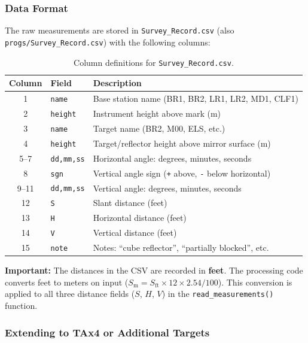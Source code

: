 \documentclass[11pt,letterpaper]{article}
\begin{document}
\subsubsection{Data Format}

The raw measurements are stored in \texttt{Survey\_Record.csv} (also \texttt{progs/Survey\_Record.csv}) with the following columns:

\begin{table}[H]
\centering
\caption{Column definitions for \texttt{Survey\_Record.csv}.}
\label{tab:csv_format}
\smallskip
\footnotesize
\begin{tabular}{@{}cll@{}}
\toprule
{Column} & {Field} & {Description} \\
\midrule
1  & \texttt{name}     & Base station name (BR1, BR2, LR1, LR2, MD1, CLF1) \\
2  & \texttt{height}   & Instrument height above mark (m) \\
3  & \texttt{name}     & Target name (BR2, M00, ELS, etc.) \\
4  & \texttt{height}   & Target/reflector height above mirror surface (m) \\
5--7  & \texttt{dd,mm,ss} & Horizontal angle: degrees, minutes, seconds \\
8  & \texttt{sgn}      & Vertical angle sign (\texttt{+} above, \texttt{-} below horizontal) \\
9--11 & \texttt{dd,mm,ss} & Vertical angle: degrees, minutes, seconds \\
12 & \texttt{S}        & Slant distance (feet) \\
13 & \texttt{H}        & Horizontal distance (feet) \\
14 & \texttt{V}        & Vertical distance (feet) \\
15 & \texttt{note}     & Notes: ``cube reflector'', ``partially blocked'', etc. \\
\bottomrule
\end{tabular}
\end{table}

\noindent \textbf{Important:} The distances in the CSV are recorded in \textbf{feet}. The processing code converts feet to meters on input ($S_{\text{m}} = S_{\text{ft}} \times 12 \times 2.54 / 100$). This conversion is applied to all three distance fields ($S$, $H$, $V$) in the \texttt{read\_measurements()} function.

\subsubsection{Extending to TAx4 or Additional Targets}
\end{document}
